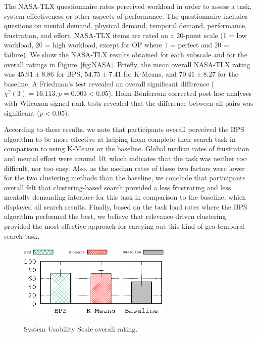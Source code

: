 The NASA-TLX questionnaire rates perceived workload in order to assess a task, system effectiveness or other aspects of performance.
The questionnaire includes questions on mental demand, physical demand, temporal demand, performance, frustration, and effort. NASA-TLX items are rated on a 20-point scale (1 = low workload, 20 = high workload, except for OP where 1 = perfect and 20 = failure). 
We show the NASA-TLX results obtained  for each subscale and for the overall ratings  in Figure~\ref{fig:NASA}.
Briefly, the mean overall NASA-TLX rating was $45.91\pm 8.86$ for BPS, $54.75\pm 7.41$ for K-Means, and $70.41\pm 8.27$ for the baseline. 
A Friedman's test revealed an overall significant difference ($\chi^2(3)= 16.113, p=0.003 < 0.05$).
Holm-Bonferroni corrected post-hoc analyses with Wilcoxon signed-rank tests 
revealed that the difference between all pairs was significant ($p < 0.05$). %


According to these results, we note that participants overall perceived the BPS algorithm to be more effective at helping them complete their search task in comparison to using K-Means or the baseline.  Global median rates of frustration and mental effort were around 10, which indicates that the task was neither too difficult, nor too easy.  Also, as the median rates of these two factors were lower for the two clustering methods than the baseline, we conclude that participants overall felt that clustering-based search provided a less frustrating and less mentally demanding interface for this task in comparison to the baseline, which displayed all search results. 
Finally, based on the task load rates where the BPS algorithm performed the best, we believe that relevance-driven clustering provided the most effective approach for carrying out this kind of geo-temporal search task.

\begin{figure}[t]
\begin{centering}
\includegraphics[width=7.5cm]{imgs/legend4}
{\includegraphics[width=7.5cm]{imgs/SUS_AVERAGE}}
\par\end{centering}
\caption{System Usability Scale overall rating.}
\label{fig:SUS}
\end{figure}

